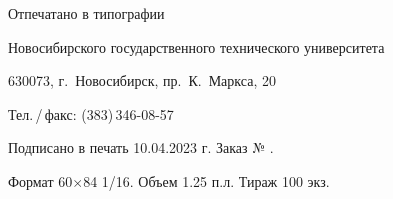 
\newpage
\thispagestyle{empty}
\vspace*{0pt plus1fill}
\begin{center}
    Отпечатано в типографии \par
    Новосибирского государственного технического университета \par   
    630073, г.~Новосибирск, пр.~К.~Маркса, 20 \par
    Тел.\,/\,факс: (383)\,346-08-57 \par
    Подписано в печать 10.04.2023 г. Заказ № . \par
    Формат 60$\times$84 1/16. Объем 1.25 п.л. Тираж 100 экз.
\end{center}